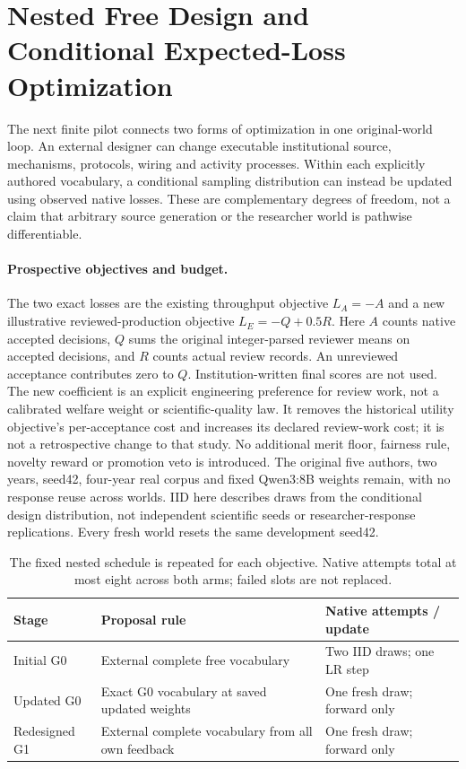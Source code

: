 \section{Nested Free Design and Conditional Expected-Loss Optimization}
\label{sec:nested-design-v13}

The next finite pilot connects two forms of optimization in one original-world
loop. An external designer can change executable institutional source,
mechanisms, protocols, wiring and activity processes. Within each explicitly
authored vocabulary, a conditional sampling distribution can instead be updated
using observed native losses. These are complementary degrees of freedom, not
a claim that arbitrary source generation or the researcher world is
pathwise differentiable.

\paragraph{Prospective objectives and budget.}
The two exact losses are the existing throughput objective $L_A=-A$ and a new
illustrative reviewed-production objective $L_E=-Q+0.5R$. Here $A$ counts native
accepted decisions, $Q$ sums the original integer-parsed reviewer means on
accepted decisions, and $R$ counts actual review records. An unreviewed
acceptance contributes zero to $Q$. Institution-written final scores are not
used. The new coefficient is an explicit engineering preference for review
work, not a calibrated welfare weight or scientific-quality law. It removes
the historical utility objective's per-acceptance cost and increases its
declared review-work cost; it is not a retrospective change to that study.
No additional merit floor, fairness rule, novelty reward or promotion veto is
introduced. The original five authors, two years, seed42, four-year real corpus
and fixed Qwen3:8B weights remain, with no response reuse across worlds.
IID here describes draws from the conditional design distribution, not
independent scientific seeds or researcher-response replications. Every fresh
world resets the same development seed42.

\begin{table}[t]
\caption{The fixed nested schedule is repeated for each objective. Native
attempts total at most eight across both arms; failed slots are not replaced.}
\label{tab:nested-schedule-v13}
\centering
\small
\begin{tabular}{p{.22\linewidth}p{.43\linewidth}p{.23\linewidth}}
\toprule
Stage & Proposal rule & Native attempts / update \\
\midrule
Initial G0 & External complete free vocabulary & Two IID draws; one LR step \\
Updated G0 & Exact G0 vocabulary at saved updated weights & One fresh draw; forward only \\
Redesigned G1 & External complete vocabulary from all own feedback & One fresh draw; forward only \\
\bottomrule
\end{tabular}
\end{table}

